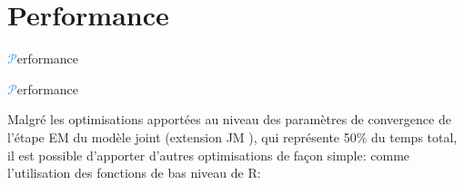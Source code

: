 \section{Performance}
\begin{frame}{{\huge\textcolor{dodgerblue}{$\mathcal{P}$}}erformance}{}
\begin{center}
\end{center}
\end{frame}
\begin{frame}{{\huge\textcolor{dodgerblue}{$\mathcal{P}$}}erformance}{}
\par{Malgré les optimisations apportées au niveau des paramètres de convergence de l'étape EM du modèle joint (extension \textcolor{springgreen3}{JM} \textcolor{dodgerblue}{\citep{rizopoulos_jm_2010}}),
qui représente \textcolor{springgreen3}{50\%} du temps total,
il est possible d'apporter d'autres optimisations de façon simple: comme l'utilisation des fonctions de bas niveau de \textcolor{springgreen3}{R}:}
\begin{center}
\end{center}
\end{frame}

